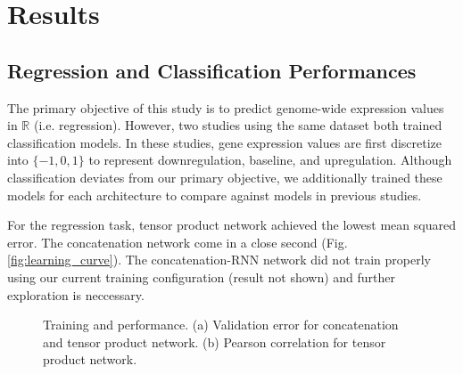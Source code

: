 \documentclass{article}
\begin{document}
\section{Results}
\subsection{Regression and Classification Performances}

The primary objective of this study is to predict genome-wide expression values in $\mathbb{R}$ (i.e. regression). However, two studies using the same dataset both trained classification models. In these studies, gene expression values are first discretize into $\{-1,0,1\}$ to represent downregulation, baseline, and upregulation. Although classification deviates from our primary objective, we additionally trained these models for each architecture to compare against models in previous studies. 

For the regression task, tensor product network achieved the lowest mean squared error. The concatenation network come in a close second (Fig. \ref{fig:learning_curve}). The concatenation-RNN network did not train properly using our current training configuration (result not shown) and further exploration is neccessary.

\begin{figure}
\centering
{}
\caption{Training and performance. (a) Validation error for concatenation and tensor product network. (b) Pearson correlation for tensor product network.}

\end{figure}
\end{document}
